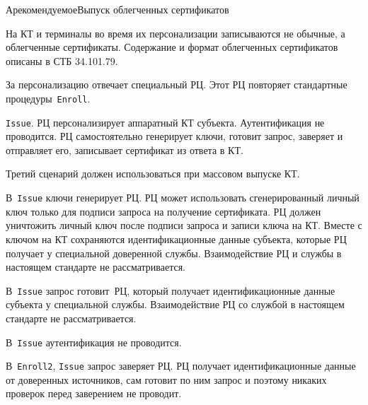 \begin{appendix}{А}{рекомендуемое}{Выпуск облегченных сертификатов}
\label{ISSUE}

\mbox{}

На КТ и терминалы во время их персонализации записываются не обычные,
а облегченные сертификаты. Содержание и формат облегченных сертификатов 
описаны в СТБ 34.101.79.

За персонализацию отвечает специальный РЦ. Этот РЦ повторяет стандартные 
процедуры~\texttt{Enroll}. 

\texttt{Issue}. 
РЦ персонализирует аппаратный КТ субъекта. 
Аутентификация не проводится. РЦ самостоятельно генерирует ключи,
готовит запрос, заверяет и отправляет его, записывает сертификат из ответа 
в КТ.

Третий сценарий должен использоваться при массовом выпуске КТ.

\label{PROCESSES.Enroll.Gen}

В~\texttt{Issue} ключи генерирует РЦ. 
РЦ может использовать сгенерированный личный ключ только для 
подписи запроса на получение сертификата. РЦ должен уничтожить личный ключ 
после подписи запроса и записи ключа на КТ.
%
Вместе с ключом на КТ сохраняются идентификационные данные субъекта,
которые РЦ получает у специальной доверенной службы. 
Взаимодействие РЦ и службы в настоящем стандарте не рассматривается.


\label{PROCESSES.Enroll.CSR}

В~\texttt{Issue} запрос готовит~РЦ, который получает идентификационные 
данные субъекта у специальной службы. Взаимодействие РЦ со службой в 
настоящем стандарте не рассматривается.


В~\texttt{Issue} аутентификация не проводится.


В~\texttt{Enroll2}, \texttt{Issue} запрос заверяет РЦ.
РЦ получает идентификационные данные от доверенных источников,
сам готовит по ним запрос и поэтому никаких проверок перед заверением
не проводит.  


\end{appendix}
